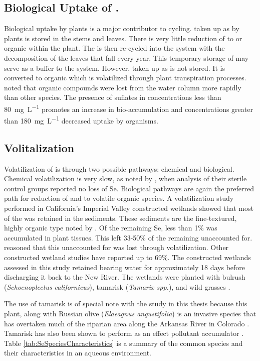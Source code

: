 \begin{linenumbers}[1]
\subsection*{Biological Uptake of \Se.}
Biological uptake by plants is a major contributor to \Se cycling.  \Se taken up as \selenate by plants is stored in the stems and leaves.  There is very little reduction of \selenate to \selenite or organic \Se within the plant.  The \selenate is then re-cycled into the system with the decomposition of the leaves that fall every year.  This temporary storage of \Se may serve as a buffer to the system.  However, \Se taken up as \selenite is not stored.  It is converted to organic \Se which is volatilized through plant transpiration processes.  \textcite{Besser1989} noted that organic \Se compounds were lost from the water column more rapidly than other \Se species.  The presence of suflates in concentrations less than \SI{80}{\milli\g\per\liter} promotes an increase in \Se bio-accumulation and concentrations greater than \SI{180}{\milli\g\per\liter} decreased \Se uptake by organisms.   

\subsection*{\Se Volitalization}
Volatilization of \Se is through two possible pathways: chemical and biological.  Chemical volatilization is very slow, as noted by \textcite{Besser1989}, when analysis of their sterile control groups reported no loss of Se. Biological pathways are again the preferred path for reduction of \selenate and \selenite to volatile organic \Se species.  A \Se volatilization study performed in California's Imperial Valley constructed wetlands showed that most of the \Se was retained in the sediments.  These sediments are the fine-textured, highly organic type noted by \textcite{Besser1989}.  Of the remaining Se, less than 1\% was accumulated in plant tissues.  This left 33-50\% of the remaining \Se unaccounted for.  \textcite{Gersberg2006} reasoned that this unaccounted for \Se was lost through volatilization.  Other constructed wetland studies have reported up to 69\%.  The constructed wetlands assessed in this study retained \Se bearing water for approximately 18 days before discharging it back to the New River.  The wetlands were planted with bulrush (\textit{Schoenoplectus californicus}), tamarisk (\textit{Tamarix spp.}), and wild grasses \parencite{Gersberg2006,johnson2009}.  

The use of tamarisk is of special note with the study in this thesis because this plant, along with Russian olive (\textit{Elaeagnus angustifolia}) is an invasive species that has overtaken much of the riparian area along the Arkansas River in Colorado \parencite{Nagler2010a}.  Tamarisk has also been shown to perform as an effect pollutant accumulator \parencite{Sorensen2009}. Table \ref{tab:SeSpeciesCharacteristics} is a summary of the common \Se species and their characteristics in an aqueous environment.


\end{linenumbers}
